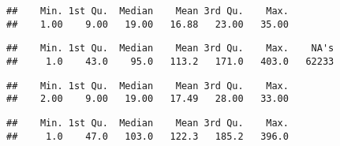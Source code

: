 \documentclass[
]{article}
\newenvironment{Shaded}{\begin{snugshade}}{\end{snugshade}}
\newcommand{\FunctionTok}[1]{\textcolor[rgb]{0.00,0.00,0.00}{#1}}
\newcommand{\NormalTok}[1]{#1}
\newcommand{\OtherTok}[1]{\textcolor[rgb]{0.56,0.35,0.01}{#1}}
\newcommand{\SpecialCharTok}[1]{\textcolor[rgb]{0.00,0.00,0.00}{#1}}
\begin{document}
\begin{Shaded}
\end{Shaded}

\begin{verbatim}
##    Min. 1st Qu.  Median    Mean 3rd Qu.    Max. 
##    1.00    9.00   19.00   16.88   23.00   35.00
\end{verbatim}

\begin{Shaded}
\end{Shaded}

\begin{verbatim}
##    Min. 1st Qu.  Median    Mean 3rd Qu.    Max.    NA's 
##     1.0    43.0    95.0   113.2   171.0   403.0   62233
\end{verbatim}

\begin{Shaded}
\end{Shaded}

\begin{verbatim}
##    Min. 1st Qu.  Median    Mean 3rd Qu.    Max. 
##    2.00    9.00   19.00   17.49   28.00   33.00
\end{verbatim}

\begin{Shaded}
\end{Shaded}

\begin{verbatim}
##    Min. 1st Qu.  Median    Mean 3rd Qu.    Max. 
##     1.0    47.0   103.0   122.3   185.2   396.0
\end{verbatim}
\end{document}
